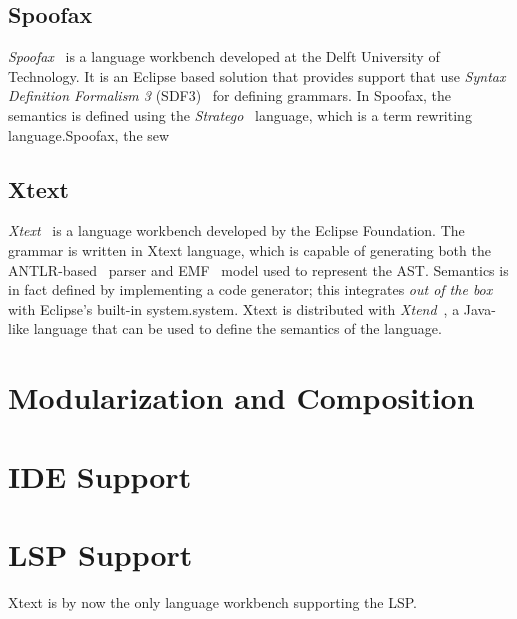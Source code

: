 \subsection{Spoofax}\label{subsec:background:spoofax}

\textit{Spoofax}~\cite{Visser10} is a language workbench developed at the Delft University of Technology. It is an Eclipse based solution that provides support that use \textit{Syntax Definition Formalism 3} (SDF3)~\cite{Heering89c} for defining grammars.
In Spoofax, the semantics is defined using the \textit{Stratego}~\cite{Visser01} language, which is a term rewriting language.Spoofax, the sew

\subsection{Xtext}\label{subsec:background:xtext}

\textit{Xtext}~\cite{Bettini13b} is a language workbench developed by the Eclipse Foundation. The grammar is written in Xtext language, which is capable of generating both the ANTLR-based~\cite{Parr95} parser and EMF~\cite{Steinberg08} model used to represent the AST.  Semantics is in fact defined by implementing a code generator; this integrates \textit{out of the box} with Eclipse's built-in system.system. Xtext is distributed with \textit{Xtend}~\cite{Eysholdt10}, a Java-like language that can be used to define the semantics of the language.

\section{Modularization and Composition}\label{sec:background:modularization}

\section{IDE Support}\label{sec:background:ide-support}

\section{LSP Support}\label{sec:background:lsp-support}
Xtext is by now the only language workbench supporting the LSP.~\cite{Bunder19a}
